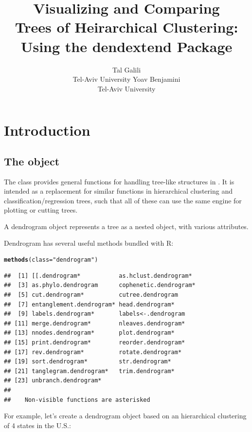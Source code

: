 \documentclass[shortnames,nojss,article]{jss}\usepackage[]{graphicx}\usepackage[]{color}
\title{Visualizing and Comparing\\ Trees of Heirarchical Clustering:\\ Using the dendextend \proglang{R} Package}
\author{Tal Galili\\Tel-Aviv University \And Yoav Benjamini\\Tel-Aviv University}
\makeatletter
\newcommand{\hlstr}[1]{\textcolor[rgb]{0.192,0.494,0.8}{#1}}%
\newcommand{\hlstd}[1]{\textcolor[rgb]{0.345,0.345,0.345}{#1}}%
\newcommand{\hlkwc}[1]{\textcolor[rgb]{0.333,0.667,0.333}{#1}}%
\newcommand{\hlkwd}[1]{\textcolor[rgb]{0.737,0.353,0.396}{\textbf{#1}}}%
\newenvironment{kframe}{%
 \def\at@end@of@kframe{}%
 \ifinner\ifhmode%
  \def\at@end@of@kframe{\end{minipage}}%
  \begin{minipage}{\columnwidth}%
 \fi\fi%
 \def\FrameCommand##1{\hskip\@totalleftmargin \hskip-\fboxsep
 \colorbox{shadecolor}{##1}\hskip-\fboxsep
     \hskip-\linewidth \hskip-\@totalleftmargin \hskip\columnwidth}%
 \MakeFramed {\advance\hsize-\width
   \@totalleftmargin\z@ \linewidth\hsize
   \@setminipage}}%
 {\par\unskip\endMakeFramed%
 \at@end@of@kframe}
\newenvironment{knitrout}{}{} %
\makeatother
\begin{document}
\vspace*{-0.25cm}



\section{Introduction}

\subsection{The  object}

The  class provides general functions for handling tree-like structures in  \citep{R:Main}. It is intended as a replacement for similar functions in hierarchical clustering and classification/regression trees, such that all of these can use the same engine for plotting or cutting trees.

A dendrogram object represents a tree as a nested  object, with various attributes.

Dendrogram has several useful methods bundled with R:

\begin{knitrout}
\color{fgcolor}\begin{kframe}
\begin{alltt}
\hlkwd{methods}\hlstd{(}\hlkwc{class} \hlstd{=} \hlstr{"dendrogram"}\hlstd{)}
\end{alltt}
\begin{verbatim}
##  [1] [[.dendrogram*           as.hclust.dendrogram*   
##  [3] as.phylo.dendrogram      cophenetic.dendrogram*  
##  [5] cut.dendrogram*          cutree.dendrogram       
##  [7] entanglement.dendrogram* head.dendrogram*        
##  [9] labels.dendrogram*       labels<-.dendrogram     
## [11] merge.dendrogram*        nleaves.dendrogram*     
## [13] nnodes.dendrogram*       plot.dendrogram*        
## [15] print.dendrogram*        reorder.dendrogram*     
## [17] rev.dendrogram*          rotate.dendrogram*      
## [19] sort.dendrogram*         str.dendrogram*         
## [21] tanglegram.dendrogram*   trim.dendrogram*        
## [23] unbranch.dendrogram*    
## 
##    Non-visible functions are asterisked
\end{verbatim}
\end{kframe}
\end{knitrout}


For example, let's create a dendrogram object based on an hierarchical clustering of 4 states in the U.S.:
\end{document}
